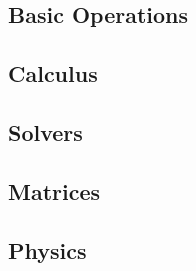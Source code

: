 \subsection{Basic Operations}

\subsection{Calculus}

\subsection{Solvers}

\subsection{Matrices}

\subsection{Physics}

